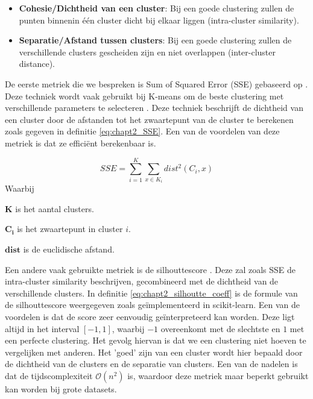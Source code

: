 \begin{itemize}
    \item \textbf{Cohesie/Dichtheid van een cluster}:  Bij een goede clustering zullen de punten binnenin één cluster dicht bij elkaar liggen (intra-cluster similarity).
    \item \textbf{Separatie/Afstand tussen clusters}: Bij een goede clustering zullen de verschillende clusters gescheiden zijn en niet overlappen (inter-cluster distance).
\end{itemize}

De eerste metriek die we bespreken is Sum of Squared Error (SSE) gebaseerd op \cite{cursus_ML_unsupervised}. Deze techniek wordt vaak gebruikt bij K-means om de beste clustering met verschillende parameters te selecteren \cite{sse_with_kmeans}. Deze techniek beschrijft de dichtheid van een cluster door de afstanden tot het zwaartepunt van de cluster te berekenen zoals gegeven in definitie \ref{eq:chapt2_SSE}. Een van de voordelen van deze metriek is dat ze efficiënt berekenbaar is.

\begin{equation}
    SSE = \sum_{i=1}^{K}\sum_{x \in K_i} dist^2(C_i, x)
    \label{eq:chapt2_SSE}
\end{equation}
Waarbij
\begin{description}
    \item$\mathbf{K}$ is het aantal clusters.
    \item$\mathbf{C_i}$ is het zwaartepunt in cluster $i$.
    \item$\mathbf{dist}$ is de euclidische afstand.
\end{description}

Een andere vaak gebruikte metriek is de silhouttescore \cite{silhoutte_score_paper}. Deze zal zoals SSE de intra-cluster similarity beschrijven, gecombineerd met de dichtheid van de verschillende clusters. In definitie \ref{eq:chapt2_silhoutte_coeff} is de formule van de silhouttescore weergegeven zoals geïmplementeerd in scikit-learn. \cite{eval_metrics_scikit} Een van de voordelen is dat de score zeer eenvoudig geïnterpreteerd kan worden. Deze ligt altijd in het interval $[-1,1]$, waarbij $-1$ overeenkomt met de slechtste en $1$ met een perfecte clustering. Het gevolg hiervan is dat we een clustering niet hoeven te vergelijken met anderen. Het 'goed' zijn van een cluster wordt hier bepaald door de dichtheid van de clusters en de separatie van clusters. Een van de nadelen is dat de tijdscomplexiteit $\mathcal{O}(n^2)$ is, waardoor deze metriek maar beperkt gebruikt kan worden bij grote datasets.

